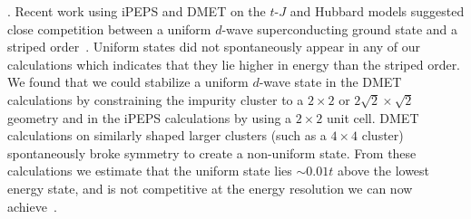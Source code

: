 \documentclass[12pt]{article}
\newcommand{\blue}{\textcolor{blue}}
\begin{document}





. %
Recent work using iPEPS and DMET on the $t$-$J$ and Hubbard models suggested close competition between a 
 uniform $d$-wave superconducting ground state and a striped order~\cite{Corboz2014, zheng2016}.
 Uniform states did not spontaneously appear in any of our calculations which indicates that they
lie higher in energy than the striped order. We found that we could stabilize a uniform $d$-wave state
in the DMET calculations by constraining the impurity cluster to a $2\times 2$ or $2\sqrt{2} \times \sqrt{2}$ geometry
and in the iPEPS calculations by using a $2\times2$ unit cell. DMET calculations on similarly
shaped larger clusters (such as a $4\times 4$ cluster) spontaneously broke symmetry to create a non-uniform state. From
these calculations we estimate that the uniform state lies $\sim 0.01t$ above the lowest energy state, and is not competitive
at the energy resolution we can now achieve~\cite{supplementary}.
\end{document}
